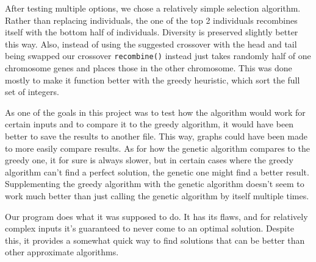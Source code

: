 \documentclass[a4paper,10pt]{article}
\begin{document}
After testing multiple options, we chose a relatively simple selection algorithm.
Rather than replacing individuals, the one of the top 2 individuals recombines itself with the bottom half of individuals.
Diversity is preserved slightly better this way.
Also, instead of using the suggested crossover with the head and tail being swapped our crossover {\tt recombine()} instead just takes randomly half of one chromosome genes and places those in the other chromosome.
This was done mostly to make it function better with the greedy heuristic, which sort the full set of integers.

As one of the goals in this project was to test how the algorithm would work for certain inputs and to compare it to the greedy algorithm, it would have been better to save the results to another file.
This way, graphs could have been made to more easily compare results.
As for how the genetic algorithm compares to the greedy one, it for sure is always slower, but in certain cases where the greedy algorithm can't find a perfect solution, the genetic one might find a better result.
Supplementing the greedy algorithm with the genetic algorithm doesn't seem to work much better than just calling the genetic algorithm by itself multiple times.



Our program does what it was supposed to do.
It has its flaws, and for relatively complex inputs it's guaranteed to never come to an optimal solution.
Despite this, it provides a somewhat quick way to find solutions that can be better than other approximate algorithms.
\end{document}
